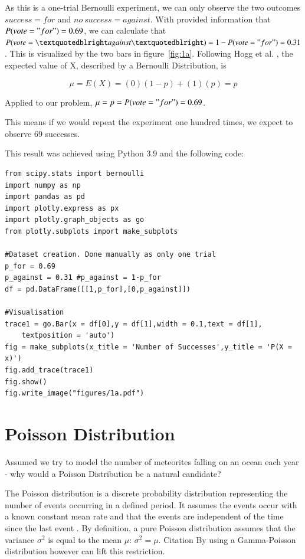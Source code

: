 As this is a one-trial Bernoulli experiment, we can only observe the two outcomes $success = for$ and $no~success = against$. With provided information that $P(vote = "for") = 0.69$, we can calculate that $P(vote=”against”) = 1 - P(vote = "for") = 0.31$. This is visualized by the two bars in figure~\ref{fig:1a}. Following Hogg et al. \cite[Chapter~3.1]{hogg}, the expected value of X, described by a Bernoulli Distribution, is 

\begin{equation}  \mu = E(X) = (0)(1-p) + (1)(p) = p
\label{expvaluebernoulli}\end{equation}

Applied to our problem,  $ \mu = p = P(vote = "for") = 0.69 $.

This means if we would repeat the experiment one hundred times, we expect to observe 69 successes. 


This result was achieved using Python 3.9 and the following code:

\begin{lstlisting}
from scipy.stats import bernoulli
import numpy as np
import pandas as pd
import plotly.express as px
import plotly.graph_objects as go
from plotly.subplots import make_subplots

#Dataset creation. Done manually as only one trial
p_for = 0.69
p_against = 0.31 #p_against = 1-p_for
df = pd.DataFrame([[1,p_for],[0,p_against]])

#Visualisation
trace1 = go.Bar(x = df[0],y = df[1],width = 0.1,text = df[1], 
    textposition = 'auto')
fig = make_subplots(x_title = 'Number of Successes',y_title = 'P(X = x)')
fig.add_trace(trace1)
fig.show()
fig.write_image("figures/1a.pdf")
\end{lstlisting}

\section{Poisson Distribution}

Assumed we try to model the number of meteorites falling on an ocean each year - why would a Poisson Distribution be a natural candidate?


The Poisson distribution is a discrete probability distribution representing the number of events occurring in a defined period. It assumes the events occur with a known constant mean rate and that the events are independent of the time since the last event \cite[Chapter~4.6]{illowsky2018introductory}. By definition, a pure Poisson distribution assumes that the variance $\sigma^2$ is equal to the mean $\mu$: $\sigma^2 = \mu$. Citation By using a Gamma-Poisson distribution however can lift this restriction. 

